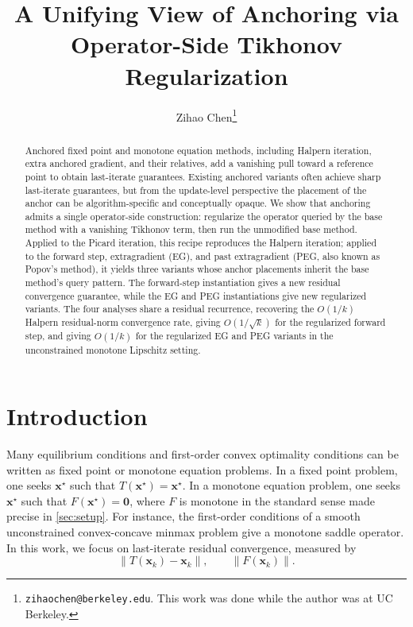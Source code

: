 \documentclass[letterpaper,11pt]{article}
\title{A Unifying View of Anchoring via Operator-Side Tikhonov Regularization}
\author{Zihao Chen\thanks{\texttt{zihaochen@berkeley.edu}. This work was done while the author was at UC Berkeley.}}
\date{}
\newcommand{\norm}[1]{\left\| #1 \right\|}
\newcommand{\vect}[1]{\mathbf{#1}}
\begin{document}
\maketitle

\begin{abstract}
Anchored fixed point and monotone equation methods, including Halpern iteration, extra anchored gradient, and their relatives, add a vanishing pull toward a reference point to obtain last-iterate guarantees. Existing anchored variants often achieve sharp last-iterate guarantees, but from the update-level perspective the placement of the anchor can be algorithm-specific and conceptually opaque. We show that anchoring admits a single operator-side construction: regularize the operator queried by the base method with a vanishing Tikhonov term, then run the unmodified base method. Applied to the Picard iteration, this recipe reproduces the Halpern iteration; applied to the forward step, extragradient (EG), and past extragradient (PEG, also known as Popov's method), it yields three variants whose anchor placements inherit the base method's query pattern. The forward-step instantiation gives a new residual convergence guarantee, while the EG and PEG instantiations give new regularized variants. The four analyses share a residual recurrence, recovering the \(O(1/k)\) Halpern residual-norm convergence rate, giving \(O(1/\sqrt{k})\) for the regularized forward step, and giving \(O(1/k)\) for the regularized EG and PEG variants in the unconstrained monotone Lipschitz setting.
\end{abstract}

% 
% 
\section{Introduction}
\label{sec:introduction}

Many equilibrium conditions and first-order convex optimality conditions can be
written as fixed point or monotone equation problems. In a fixed point problem,
one seeks \(\vect{x}^\star\) such that
\(T(\vect{x}^\star)=\vect{x}^\star\). In a monotone equation problem, one seeks
\(\vect{x}^\star\) such that
\(F(\vect{x}^\star)=\vect{0}\), where \(F\) is monotone in the standard sense
made precise in \cref{sec:setup}. For instance, the first-order conditions of a smooth
unconstrained convex-concave minmax problem give a monotone saddle operator.
In this work, we focus on last-iterate residual convergence, measured by
\[
    \norm{T(\vect{x}_k)-\vect{x}_k},
    \qquad
    \norm{F(\vect{x}_k)}.
\]
\end{document}
